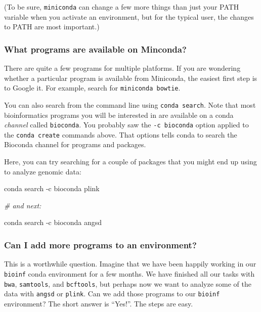 \documentclass[]{krantz}
\makeatletter
\newenvironment{Shaded}{\begin{snugshade}}{\end{snugshade}}
\newcommand{\CommentTok}[1]{\textcolor[rgb]{0.37,0.37,0.37}{\textit{#1}}}
\newcommand{\ExtensionTok}[1]{#1}
\newcommand{\NormalTok}[1]{#1}
\newenvironment{kframe}{%
\medskip{}
\setlength{\fboxsep}{.8em}
 \def\at@end@of@kframe{}%
 \ifinner\ifhmode%
  \def\at@end@of@kframe{\end{minipage}}%
  \begin{minipage}{\columnwidth}%
 \fi\fi%
 \def\FrameCommand##1{\hskip\@totalleftmargin \hskip-\fboxsep
 \colorbox{shadecolor}{##1}\hskip-\fboxsep
     \hskip-\linewidth \hskip-\@totalleftmargin \hskip\columnwidth}%
 \MakeFramed {\advance\hsize-\width
   \@totalleftmargin\z@ \linewidth\hsize
   \@setminipage}}%
 {\par\unskip\endMakeFramed%
 \at@end@of@kframe}
\renewenvironment{Shaded}{\begin{kframe}}{\end{kframe}}
\makeatother
\begin{document}
(To be sure, \texttt{miniconda} can change a few more things than just your PATH variable when you activate an environment, but
for the typical user, the changes to PATH are most important.)

\hypertarget{what-programs-are-available-on-minconda}{%
\subsubsection{What programs are available on Minconda?}\label{what-programs-are-available-on-minconda}}

There are quite a few programs for multiple platforms. If you are wondering
whether a particular program is available from Miniconda, the easiest first
step is to Google it. For example, search for \texttt{miniconda\ bowtie}.

You can also search from the command line using \texttt{conda\ search}. Note that most
bioinformatics programs you will be interested in are available on a conda
\emph{channel} called \texttt{bioconda}. You probably saw the \texttt{-c\ bioconda} option
applied to the \texttt{conda\ create} commands above. That options tells conda to search
the Bioconda channel for programs and packages.

Here, you can try searching for a couple of packages that you might
end up using to analyze genomic data:

\begin{Shaded}
\begin{Highlighting}[]
\ExtensionTok{conda}\NormalTok{ search -c bioconda plink}

\CommentTok{# and next:}

\ExtensionTok{conda}\NormalTok{ search -c bioconda angsd}
\end{Highlighting}
\end{Shaded}

\hypertarget{can-i-add-more-programs-to-an-environment}{%
\subsubsection{Can I add more programs to an environment?}\label{can-i-add-more-programs-to-an-environment}}

This is a worthwhile question. Imagine that we have been happily working in our \texttt{bioinf} conda environment
for a few months. We have finished all our tasks with \texttt{bwa}, \texttt{samtools}, and \texttt{bcftools}, but perhaps now we
want to analyze some of the data with \texttt{angsd} or \texttt{plink}. Can we add those programs to our
\texttt{bioinf} environment? The short answer is ``Yes!''. The steps are easy.
\end{document}

